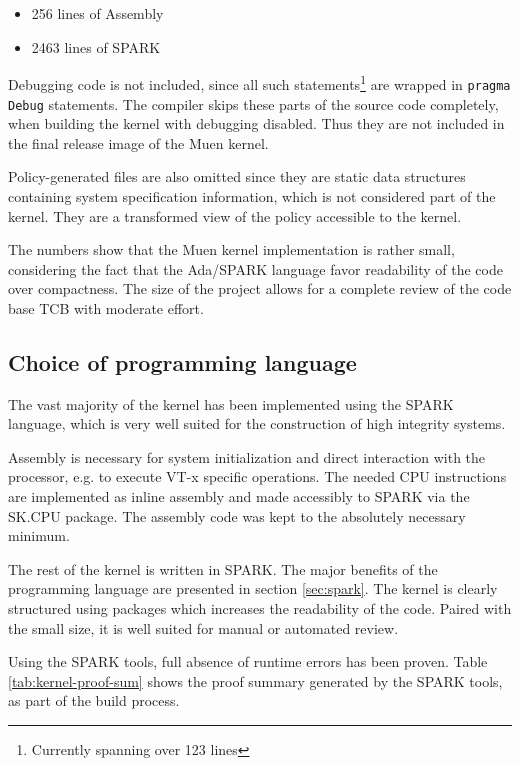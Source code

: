 \begin{itemize}
	\item 256 lines of Assembly
	\item 2463 lines of SPARK
\end{itemize}

Debugging code is not included, since all such statements\footnote{Currently
spanning over 123 lines} are wrapped in \texttt{pragma Debug} statements. The
compiler skips these parts of the source code completely, when building the
kernel with debugging disabled. Thus they are not included in the final release
image of the Muen kernel.

Policy-generated files are also omitted since they are static data structures
containing system specification information, which is not considered part of the
kernel. They are a transformed view of the policy accessible to the kernel.

The numbers show that the Muen kernel implementation is rather small,
considering the fact that the Ada/SPARK language favor readability of the code
over compactness. The size of the project allows for a complete review of the
code base TCB with moderate effort.

\subsection{Choice of programming language}
The vast majority of the kernel has been implemented using the SPARK language,
which is very well suited for the construction of high integrity systems.

Assembly is necessary for system initialization and direct interaction with the
processor, e.g. to execute VT-x specific operations. The needed CPU instructions
are implemented as inline assembly and made accessibly to SPARK via the SK.CPU
package. The assembly code was kept to the absolutely necessary minimum.

The rest of the kernel is written in SPARK. The major benefits of the
programming language are presented in section \ref{sec:spark}. The kernel is
clearly structured using packages which increases the readability of the code.
Paired with the small size, it is well suited for manual or automated review.

Using the SPARK tools, full absence of runtime errors has been proven. Table
\ref{tab:kernel-proof-sum} shows the proof summary generated by the SPARK tools,
as part of the build process.

